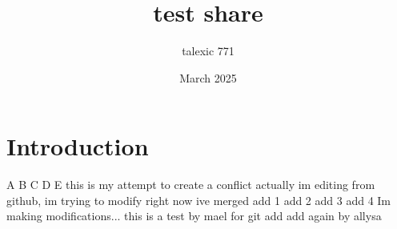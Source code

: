 \documentclass{article}
\title{test share}
\author{talexic 771 }
\date{March 2025}
\begin{document}
\maketitle

\section{Introduction}
A
B
C
D
E
this is my attempt to create a conflict
actually im editing
from github, im trying to modify right now
ive merged 
add 1
add 2
add 3
add 4
Im making modifications... 
this is a test by mael for git
add
add again by allysa
\end{document}
